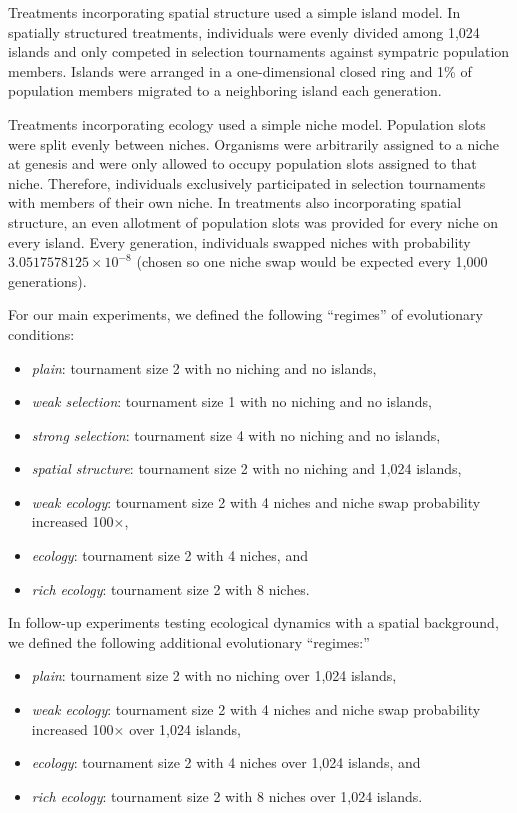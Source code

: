 Treatments incorporating spatial structure used a simple island model.
In spatially structured treatments, individuals were evenly divided among 1,024 islands and only competed in selection tournaments against sympatric population members.
Islands were arranged in a one-dimensional closed ring and 1\% of population members migrated to a neighboring island each generation.

Treatments incorporating ecology used a simple niche model.
Population slots were split evenly between niches.
Organisms were arbitrarily assigned to a niche at genesis and were only allowed to occupy population slots assigned to that niche.
Therefore, individuals exclusively participated in selection tournaments with members of their own niche.
In treatments also incorporating spatial structure, an even allotment of population slots was provided for every niche on every island.
Every generation, individuals swapped niches with probability $3.0517578125 \times 10^{-8}$ (chosen so one niche swap would be expected every 1,000 generations).

For our main experiments, we defined the following ``regimes'' of evolutionary conditions:
\begin{itemize}
  \item \textit{plain}: tournament size 2 with no niching and no islands,
  \item \textit{weak selection}: tournament size 1 with no niching and no islands,
  \item \textit{strong selection}: tournament size 4 with no niching and no islands,
  \item \textit{spatial structure}: tournament size 2 with no niching and 1,024 islands,
  \item \textit{weak ecology}: tournament size 2 with 4 niches and niche swap probability increased 100$\times$,
  \item \textit{ecology}: tournament size 2 with 4 niches, and
  \item \textit{rich ecology}: tournament size 2 with 8 niches.
\end{itemize}

In follow-up experiments testing ecological dynamics with a spatial background, we defined the following additional evolutionary ``regimes:''
\begin{itemize}
  \item \textit{plain}: tournament size 2 with no niching over 1,024 islands,
  \item \textit{weak ecology}: tournament size 2 with 4 niches and niche swap probability increased 100$\times$ over 1,024 islands,
  \item \textit{ecology}: tournament size 2 with 4 niches over 1,024 islands, and
  \item \textit{rich ecology}: tournament size 2 with 8 niches over 1,024 islands.
\end{itemize}

